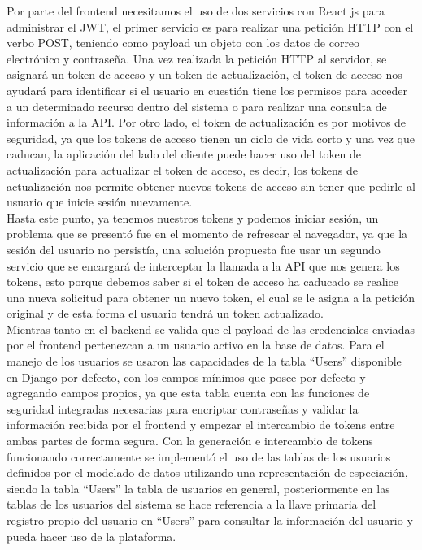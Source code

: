         Por parte del frontend necesitamos el uso de dos servicios con React js para administrar el JWT, el primer servicio es para realizar una petición HTTP con el verbo POST, teniendo como payload un objeto con los datos de correo electrónico y contraseña. Una vez realizada la petición HTTP al servidor, se asignará un token de acceso y un token de actualización, el token de acceso nos ayudará para identificar si el usuario en cuestión tiene los permisos para acceder a un determinado recurso dentro del sistema o para realizar una consulta de información a la API. Por otro lado, el token de actualización es por motivos de seguridad, ya que los tokens de acceso tienen un ciclo de vida corto y una vez que caducan, la aplicación del lado del cliente puede hacer uso del token de actualización para actualizar el token de acceso, es decir, los tokens de actualización nos permite obtener nuevos tokens de acceso sin tener que pedirle al usuario que inicie sesión nuevamente.\\
        \newline
        Hasta este punto, ya tenemos nuestros tokens y podemos iniciar sesión, un problema que se presentó fue en el momento de refrescar el navegador, ya que la sesión del usuario no persistía, una solución propuesta fue usar un segundo servicio que se encargará de interceptar la llamada a la API que nos genera los tokens, esto porque debemos saber si el token de acceso ha caducado se realice una nueva solicitud para obtener un nuevo token, el cual se le asigna a la petición original y de esta forma el usuario tendrá un token actualizado.\\
        \newline        
        Mientras tanto en el backend se valida que el payload de las credenciales enviadas por el frontend pertenezcan a un usuario activo en la base de datos. Para el manejo de los usuarios se usaron las capacidades de la tabla “Users” disponible en Django por defecto, con los campos mínimos que posee por defecto y agregando campos propios, ya que esta tabla cuenta con las funciones de seguridad integradas necesarias para encriptar contraseñas y validar la información recibida por el frontend y empezar el intercambio de tokens entre ambas partes de forma segura. Con la generación e intercambio de tokens funcionando correctamente se implementó el uso de las tablas de los usuarios definidos por el modelado de datos utilizando una representación de especiación, siendo la tabla “Users” la tabla de usuarios en general, posteriormente en las tablas de los usuarios del sistema se hace referencia a la llave primaria del registro propio del usuario en “Users” para consultar la información del usuario y pueda hacer uso de la plataforma.
        
       